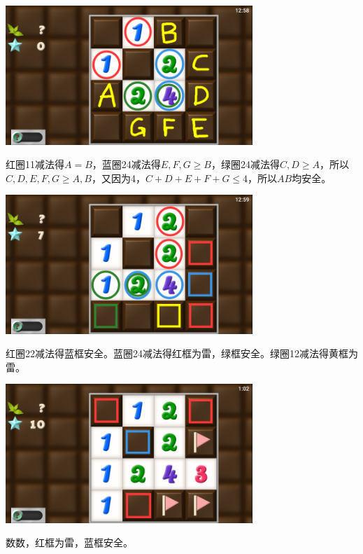\subsection{} %
\begin{center}
    \includegraphics[width=0.7\textwidth]{puzzle/139-1.png}
\end{center}
红圈11减法得$A=B$，蓝圈24减法得$E,F,G\ge B$，绿圈24减法得$C,D\ge A$，所以$C,D,E,F,G\ge A,B$，又因为4，$C+D+E+F+G\le 4$，所以$AB$均安全。
\begin{center}
    \includegraphics[width=0.7\textwidth]{puzzle/139-2.png}
\end{center}
红圈22减法得蓝框安全。蓝圈24减法得红框为雷，绿框安全。绿圈12减法得黄框为雷。
\begin{center}
    \includegraphics[width=0.7\textwidth]{puzzle/139-3.png}
\end{center}
数数，红框为雷，蓝框安全。

